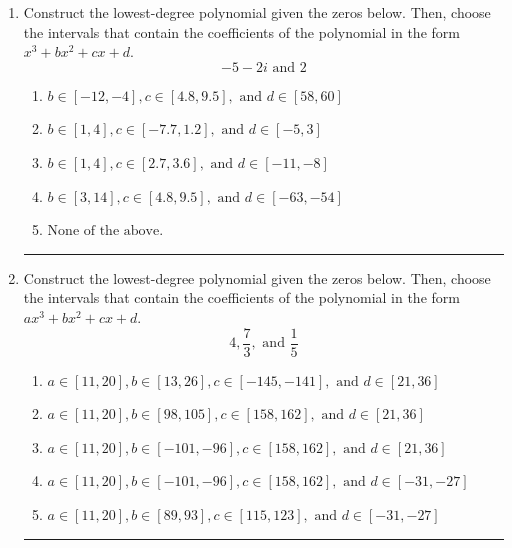 \documentclass[14pt]{extbook}
\newcommand{\litem}[1]{\item#1\hspace*{-1cm}\rule{\textwidth}{0.4pt}}
\begin{document}
\begin{enumerate}
{\begin{enumerate}[label=\Alph*.]
\end{enumerate} }
\litem{
Construct the lowest-degree polynomial given the zeros below. Then, choose the intervals that contain the coefficients of the polynomial in the form $x^3+bx^2+cx+d$.\[ -5 - 2 i \text{ and } 2 \]\begin{enumerate}[label=\Alph*.]
\item \( b \in [-12, -4], c \in [4.8, 9.5], \text{ and } d \in [58, 60] \)
\item \( b \in [1, 4], c \in [-7.7, 1.2], \text{ and } d \in [-5, 3] \)
\item \( b \in [1, 4], c \in [2.7, 3.6], \text{ and } d \in [-11, -8] \)
\item \( b \in [3, 14], c \in [4.8, 9.5], \text{ and } d \in [-63, -54] \)
\item \( \text{None of the above.} \)

\end{enumerate} }
\litem{
Construct the lowest-degree polynomial given the zeros below. Then, choose the intervals that contain the coefficients of the polynomial in the form $ax^3+bx^2+cx+d$.\[ 4, \frac{7}{3}, \text{ and } \frac{1}{5} \]\begin{enumerate}[label=\Alph*.]
\item \( a \in [11, 20], b \in [13, 26], c \in [-145, -141], \text{ and } d \in [21, 36] \)
\item \( a \in [11, 20], b \in [98, 105], c \in [158, 162], \text{ and } d \in [21, 36] \)
\item \( a \in [11, 20], b \in [-101, -96], c \in [158, 162], \text{ and } d \in [21, 36] \)
\item \( a \in [11, 20], b \in [-101, -96], c \in [158, 162], \text{ and } d \in [-31, -27] \)
\item \( a \in [11, 20], b \in [89, 93], c \in [115, 123], \text{ and } d \in [-31, -27] \)


\end{enumerate}}
\end{enumerate}
\end{document}
